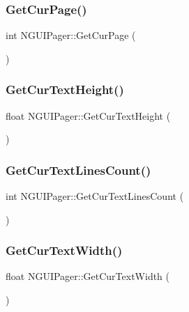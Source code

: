 \subsubsection{\texorpdfstring{Get\+Cur\+Page()}{GetCurPage()}}
{\footnotesize\ttfamily int N\+G\+U\+I\+Pager\+::\+Get\+Cur\+Page (\begin{DoxyParamCaption}{ }\end{DoxyParamCaption})}

\hypertarget{class_n_g_u_i_pager_a53e4fd8b6b4d2496e0e852ec226161da}{}\label{class_n_g_u_i_pager_a53e4fd8b6b4d2496e0e852ec226161da} 
\subsubsection{\texorpdfstring{Get\+Cur\+Text\+Height()}{GetCurTextHeight()}}
{\footnotesize\ttfamily float N\+G\+U\+I\+Pager\+::\+Get\+Cur\+Text\+Height (\begin{DoxyParamCaption}{ }\end{DoxyParamCaption})}

\hypertarget{class_n_g_u_i_pager_a29fc7abb5cab04f2ef657b27785122f7}{}\label{class_n_g_u_i_pager_a29fc7abb5cab04f2ef657b27785122f7} 
\subsubsection{\texorpdfstring{Get\+Cur\+Text\+Lines\+Count()}{GetCurTextLinesCount()}}
{\footnotesize\ttfamily int N\+G\+U\+I\+Pager\+::\+Get\+Cur\+Text\+Lines\+Count (\begin{DoxyParamCaption}{ }\end{DoxyParamCaption})}

\hypertarget{class_n_g_u_i_pager_aa99dc72f644a4439b60e498426a133c5}{}\label{class_n_g_u_i_pager_aa99dc72f644a4439b60e498426a133c5} 
\subsubsection{\texorpdfstring{Get\+Cur\+Text\+Width()}{GetCurTextWidth()}}
{\footnotesize\ttfamily float N\+G\+U\+I\+Pager\+::\+Get\+Cur\+Text\+Width (\begin{DoxyParamCaption}{ }\end{DoxyParamCaption})}

